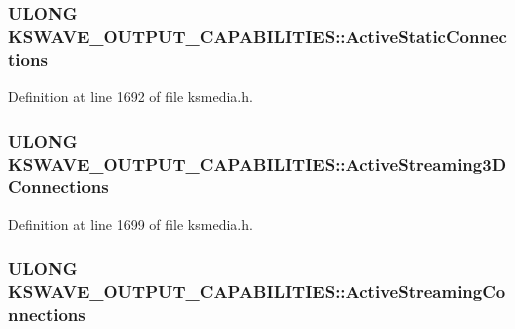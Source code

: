\subsubsection[{\texorpdfstring{Active\+Static\+Connections}{ActiveStaticConnections}}]{\setlength{\rightskip}{0pt plus 5cm}U\+L\+O\+NG K\+S\+W\+A\+V\+E\+\_\+\+O\+U\+T\+P\+U\+T\+\_\+\+C\+A\+P\+A\+B\+I\+L\+I\+T\+I\+E\+S\+::\+Active\+Static\+Connections}\hypertarget{struct_k_s_w_a_v_e___o_u_t_p_u_t___c_a_p_a_b_i_l_i_t_i_e_s_a9c065a8c2e711ba76cff7a0186282566}{}\label{struct_k_s_w_a_v_e___o_u_t_p_u_t___c_a_p_a_b_i_l_i_t_i_e_s_a9c065a8c2e711ba76cff7a0186282566}


Definition at line 1692 of file ksmedia.\+h.

\subsubsection[{\texorpdfstring{Active\+Streaming3\+D\+Connections}{ActiveStreaming3DConnections}}]{\setlength{\rightskip}{0pt plus 5cm}U\+L\+O\+NG K\+S\+W\+A\+V\+E\+\_\+\+O\+U\+T\+P\+U\+T\+\_\+\+C\+A\+P\+A\+B\+I\+L\+I\+T\+I\+E\+S\+::\+Active\+Streaming3\+D\+Connections}\hypertarget{struct_k_s_w_a_v_e___o_u_t_p_u_t___c_a_p_a_b_i_l_i_t_i_e_s_ad365d1ba5fc0e6988bbf926279ad6faf}{}\label{struct_k_s_w_a_v_e___o_u_t_p_u_t___c_a_p_a_b_i_l_i_t_i_e_s_ad365d1ba5fc0e6988bbf926279ad6faf}


Definition at line 1699 of file ksmedia.\+h.

\subsubsection[{\texorpdfstring{Active\+Streaming\+Connections}{ActiveStreamingConnections}}]{\setlength{\rightskip}{0pt plus 5cm}U\+L\+O\+NG K\+S\+W\+A\+V\+E\+\_\+\+O\+U\+T\+P\+U\+T\+\_\+\+C\+A\+P\+A\+B\+I\+L\+I\+T\+I\+E\+S\+::\+Active\+Streaming\+Connections}\hypertarget{struct_k_s_w_a_v_e___o_u_t_p_u_t___c_a_p_a_b_i_l_i_t_i_e_s_af6db05c084a4f219609c9d9b37c53ee6}{}\label{struct_k_s_w_a_v_e___o_u_t_p_u_t___c_a_p_a_b_i_l_i_t_i_e_s_af6db05c084a4f219609c9d9b37c53ee6}


